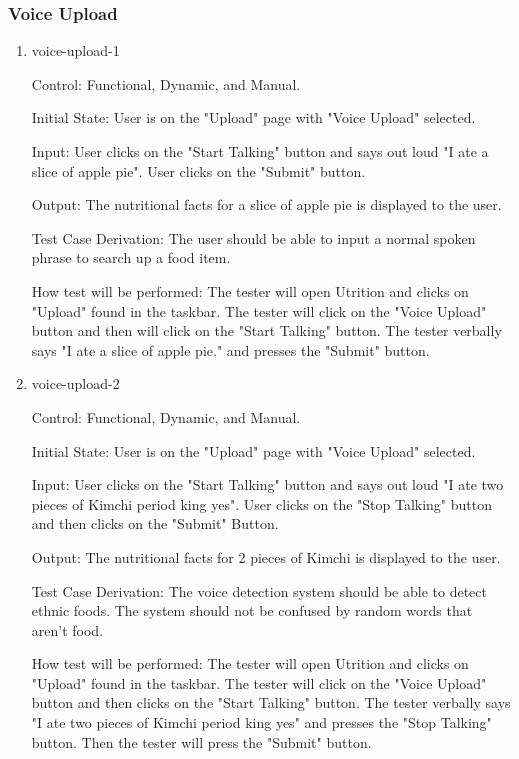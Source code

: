 \documentclass[12pt, titlepage]{article}
\begin{document}
	\subsubsection{Voice Upload}
	\begin{enumerate}
	\item{voice-upload-1\\}
	
	Control: Functional, Dynamic, and Manual.
	
	Initial State: User is on the "Upload" page with "Voice Upload" selected.
	
	Input: User clicks on the "Start Talking" button and says out loud "I ate a slice of apple pie". User clicks on the "Submit" button.
	
	Output: The nutritional facts for a slice of apple pie is displayed to the user.
	
	Test Case Derivation: The user should be able to input a normal spoken phrase to search up a food item.
	
	How test will be performed: The tester will open Utrition and clicks on "Upload" found in the taskbar. The tester will click on the "Voice Upload" button and then will click on the "Start Talking" button. The tester verbally says "I ate a slice of apple pie." and presses the "Submit" button.
	
	\item{voice-upload-2\\}
	
	Control: Functional, Dynamic, and Manual.
	
	Initial State: User is on the "Upload" page with "Voice Upload" selected.
	
	Input: User clicks on the "Start Talking" button and says out loud "I ate two pieces of Kimchi period king yes". User clicks on the "Stop Talking" button and then clicks on the "Submit" Button.
	
	Output: The nutritional facts for 2 pieces of Kimchi is displayed to the user.
	
	Test Case Derivation: The voice detection system should be able to detect ethnic foods. The system should not be confused by random words that aren't food.
	
	How test will be performed: The tester will open Utrition and clicks on "Upload" found in the taskbar. The tester will click on the "Voice Upload" button and then clicks on the "Start Talking" button. The tester verbally says "I ate two pieces of Kimchi period king yes" and presses the "Stop Talking" button. Then the tester will press the "Submit" button.
	

\end{enumerate}
\end{document}
